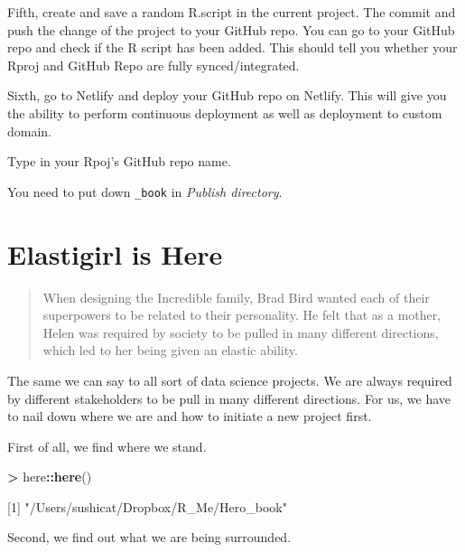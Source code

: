 \documentclass[]{book}
\newenvironment{Shaded}{\begin{snugshade}}{\end{snugshade}}
\newcommand{\DecValTok}[1]{\textcolor[rgb]{0.00,0.00,0.81}{#1}}
\newcommand{\KeywordTok}[1]{\textcolor[rgb]{0.13,0.29,0.53}{\textbf{#1}}}
\newcommand{\NormalTok}[1]{#1}
\newcommand{\OperatorTok}[1]{\textcolor[rgb]{0.81,0.36,0.00}{\textbf{#1}}}
\newcommand{\StringTok}[1]{\textcolor[rgb]{0.31,0.60,0.02}{#1}}
\begin{document}
Fifth, create and save a random R.script in the current project. The commit and push the change of the project to your GitHub repo. You can go to your GitHub repo and check if the R script has been added. This should tell you whether your Rproj and GitHub Repo are fully synced/integrated.

Sixth, go to Netlify and deploy your GitHub repo on Netlify. This will give you the ability to perform continuous deployment as well as deployment to custom domain.

Type in your Rpoj's GitHub repo name.

You need to put down \texttt{\_book} in \emph{Publish directory}.

\hypertarget{elastigirl-is-here}{%
\chapter{Elastigirl is Here}\label{elastigirl-is-here}}

\begin{quote}
When designing the Incredible family, Brad Bird wanted each of their superpowers to be related to their personality. He felt that as a mother, Helen was required by society to be pulled in many different directions, which led to her being given an elastic ability.
\end{quote}

The same we can say to all sort of data science projects. We are always required by different stakeholders to be pull in many different directions. For us, we have to nail down where we are and how to initiate a new project first.

First of all, we find where we stand.

\begin{Shaded}
\begin{Highlighting}[]
\OperatorTok{>}\StringTok{ }\NormalTok{here}\OperatorTok{::}\KeywordTok{here}\NormalTok{()}

\NormalTok{[}\DecValTok{1}\NormalTok{] }\StringTok{"/Users/sushicat/Dropbox/R_Me/Hero_book"}
\end{Highlighting}
\end{Shaded}

Second, we find out what we are being surrounded.
\end{document}
